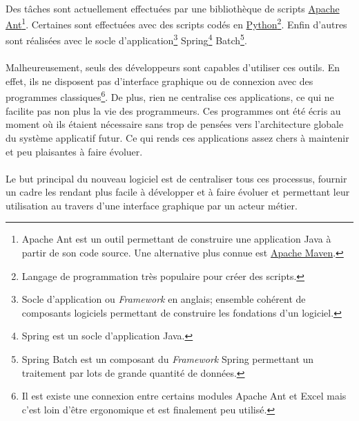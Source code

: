 \paragraph{}
Des tâches sont actuellement effectuées par une bibliothèque de scripts \href{https://ant.apache.org/}{Apache Ant}\footnote{Apache Ant est un outil permettant de construire une application Java à partir de son code source. Une alternative plus connue est \href{https://maven.apache.org/}{Apache Maven}.}.
Certaines sont effectuées avec des scripts codés en \href{https://www.python.org/}{Python}\footnote{Langage de programmation très populaire pour créer des scripts.}.
Enfin d'autres sont réalisées avec le socle d'application\footnote{Socle d'application ou \textit{Framework} en anglais; ensemble cohérent de composants logiciels permettant de construire les fondations d'un logiciel\cite{wikipedia_framework_2019}.} Spring\footnote{Spring est un socle d'application Java.} Batch\footnote{Spring Batch est un composant du \textit{Framework} Spring permettant un traitement par lots de grande quantité de données.}.

\paragraph{}
Malheureusement, seuls des développeurs sont capables d'utiliser ces outils.
En effet, ils ne disposent pas d'interface graphique ou de connexion avec des programmes classiques\footnote{Il est existe une connexion entre certains modules Apache Ant et Excel mais c'est loin d'être ergonomique et est finalement peu utilisé.}.
De plus, rien ne centralise ces applications, ce qui ne facilite pas non plus la vie des programmeurs.
Ces programmes ont été écris au moment où ils étaient nécessaire sans trop de pensées vers l'architecture globale du système applicatif futur.
Ce qui rends ces applications assez chers à maintenir et peu plaisantes à faire évoluer.

\paragraph{}
Le but principal du nouveau logiciel est de centraliser tous ces processus, fournir un cadre les rendant plus facile à développer et à faire évoluer et permettant leur utilisation au travers d'une interface graphique par un acteur métier.
